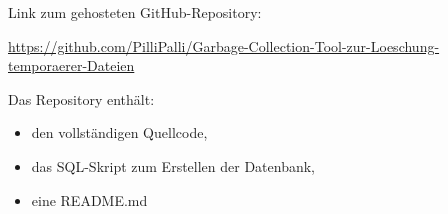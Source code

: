 

Link zum gehosteten GitHub-Repository:

\begin{footnotesize}
\url{https://github.com/PilliPalli/Garbage-Collection-Tool-zur-Loeschung-temporaerer-Dateien}
\end{footnotesize}

Das Repository enthält:
\begin{itemize}
    \item den vollständigen Quellcode,
    \item das SQL-Skript zum Erstellen der Datenbank,
    \item eine README.md
\end{itemize}
